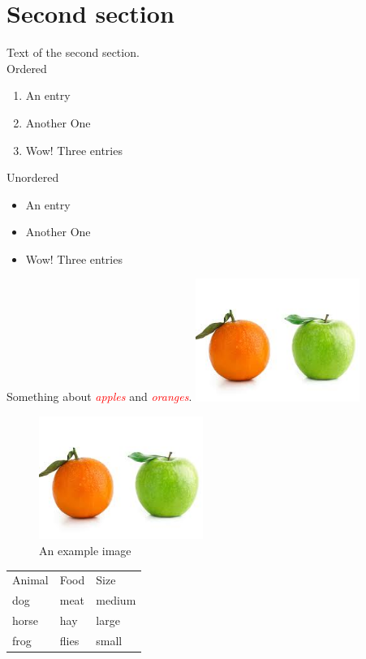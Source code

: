 \documentclass[a4paper,12pt]{book} %
\newcommand\kw[1]{\textcolor{red}{\itshape #1}}
\begin{document}
\section{Second section}
Text of the second section.
\\
Ordered
\begin{enumerate}
\item An entry
\item Another One
\item Wow! Three entries
\end{enumerate}

Unordered
\begin{itemize}
\item An entry
\item Another One
\item Wow! Three entries
\end{itemize}

Something about \kw{apples} and \kw{oranges}.
\includegraphics[height=4cm]{first.jpeg}
\begin{center}
  \begin{figure}[ht]
    \centering
    \includegraphics[height=4cm,clip, trim = 5 5 5 5]{first.jpeg}
    \caption{An example image}
  \end{figure}
\end{center}
\begin{tabular}{lll}
  Animal & Food  & Size   \\
  dog    & meat  & medium \\
  horse  & hay   & large  \\
  frog   & flies & small  \\
\end{tabular}
\end{document}
